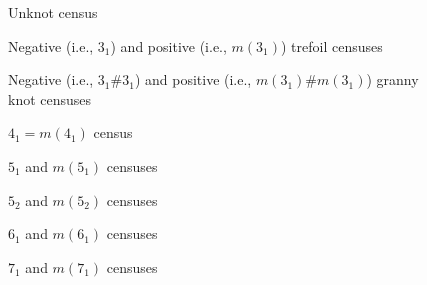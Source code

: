 \documentclass{article}
\begin{document}
\newcommand{\tinygeq}{\mathrel{\raisebox{.4ex}{\scalebox{0.7}{$\geq$}}\mkern-5mu}}
\begin{figure}[H]
    \centering
    \resizebox{0.4\linewidth}{!}{
    
    }
    \caption{Unknot census}
    \label{fig:new-unknots}
\end{figure}


\begin{figure}[H]
    \centering
    \resizebox{\linewidth}{!}{
    
    
    }
    \caption{Negative (i.e., $3_1$) and positive (i.e., $m(3_1)$) trefoil censuses}
    \label{fig:trefoils}
\end{figure}


\begin{figure}[H]
    \centering
    \scalebox{0.7}{
    
    
    }
    \caption{Negative (i.e., $3_1\# 3_1$) and positive (i.e., $m(3_1)\#m(3_1)$) granny knot censuses}
    \label{fig:granny}
\end{figure}


\begin{figure}[H]
    \centering
    \scalebox{0.7}{
    
    }
    \caption{$4_1=m(4_1)$ census}
    \label{fig:4_1}
\end{figure}

\begin{figure}[H]
    \centering
    \resizebox{\linewidth}{!}{
    
    
    }
    \caption{$5_1$ and $m(5_1)$ censuses}
    \label{fig:5_1}
\end{figure}


\begin{figure}[H]
    \centering
    \resizebox{\linewidth}{!}{
    
    
    }
    \caption{$5_2$ and $m(5_2)$ censuses}
    \label{fig:5_2}
\end{figure}


\begin{figure}[H]
    \centering
    \resizebox{\linewidth}{!}{
    
    
    }
    \caption{$6_1$ and $m(6_1)$ censuses}
    \label{fig:6_1}
\end{figure}


\begin{figure}[H]
    \centering
    \scalebox{0.7}{
    
    
    }
    \caption{$7_1$ and $m(7_1)$ censuses}
    \label{fig:7_1}
\end{figure}
\end{document}
